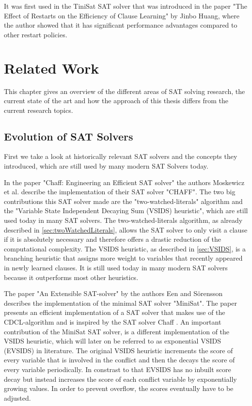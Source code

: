 It was first used in the TiniSat SAT solver that was introduced in the paper "The Effect of Restarts on the Efficiency of Clause Learning" \cite{huang2007effect} by Jinbo Huang, where the author showed that it has significant performance advantages compared to other restart policies.

\chapter{Related Work}
\label{ch:Related Work}

This chapter gives an overview of the different areas of SAT solving research, the current state of the art and how the approach of this thesis differs from the current research topics.

\section{Evolution of SAT Solvers}
First we take a look at historically relevant SAT solvers and the concepts they introduced, which are still used by many modern SAT Solvers today.

In the paper "Chaff: Engineering an Efficient SAT solver" \cite{moskewicz2001chaff} the authors Moskewicz et al. describe the implementation of their SAT solver "CHAFF". The two big contributions this SAT solver made are the "two-watched-literals" algorithm and the "Variable State Independent Decaying Sum (VSIDS) heuristic", which are still used today in many SAT solvers. The two-watched-literals algorithm, as already described in \ref{sec:twoWatchedLiterals}, allows the SAT solver to only visit a clause if it is absolutely necessary and therefore offers a drastic reduction of the computational complexity. The VSIDS heuristic, as described in \ref{sec:VSIDS}, is a branching heuristic that assigns more weight to variables that recently appeared in newly learned clauses. It is still used today in many modern SAT solvers because it outperforms most other heuristics.

The paper "An Extensible SAT-solver" \cite{een2003extensible} by the authors Een and Sörensson describes the implementation of the minimal SAT solver "MiniSat". The paper presents an efficient implementation of a SAT solver that makes use of the CDCL-algorithm and is inspired by the SAT solver Chaff \cite{moskewicz2001chaff}. An important contribution of the MiniSat SAT solver, is a different implementation of the VSIDS heuristic, which will later on be referred to as exponential VSIDS (EVSIDS) in literature. The original VSIDS heuristic increments the score of every variable that is involved in the conflict and then the decays the score of every variable periodically. In constrast to that EVSIDS has no inbuilt score decay but instead increases the score of each conflict variable by exponentially growing values. In order to prevent overflow, the scores eventually have to be adjusted.

